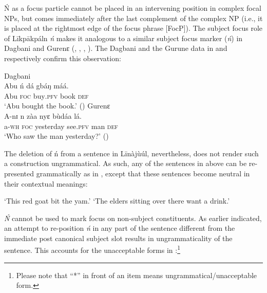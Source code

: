 \documentclass[output=paper,colorlinks,citecolor=brown]{langscibook}
\begin{document}
Ń as a focus particle cannot be placed in an intervening position in complex focal NPs, but comes immediately after the last complement of the complex NP (i.e., it is placed at the rightmost edge of the focus phrase [FocP]). The subject focus role of Līkpākpáln \textit{ń} makes it analogous to a similar subject focus marker (\textit{ń}) in Dagbani and Gurenɛ (\citealt[4]{Dakubu2003}, \citealt[169]{Issah2013Focus}, \citealt[5]{IssahSmith2018}, \citealt[169]{Akrofi-Ansah2014}). The Dagbani and the Gurune data in  and  respectively confirm this observation:

\ea%
    \label{ex:bisilki:10}
    \ea\label{ex:bisilki:10a}
    Dagbani\\
    \gll    Abu	ń	dá		gbáŋ	máá.\\
            Abu	\textsc{foc}	buy\textsc{.pfv}	book	\textsc{def}\\
    \glt    ‘Abu bought the book.’ \hfill (\citealt[5]{IssahSmith2018})
    \ex\label{ex:bisilki:10b}
    Gurenɛ\\
    \gll    A-nɪ	n	zàa		nyɛ		bùdáa	lá.\\
            a\textsc{-wh}	\textsc{foc}	yesterday	see\textsc{.pfv}	man	\textsc{def}\\
    \glt    ‘Who saw the man yesterday?’ \hfill (\citealt[4]{Dakubu2003})
    \z
\z

The deletion of ń from a sentence in Līnàjùúl, nevertheless, does not render such a construction ungrammatical. As such, any of the sentences in  above can be re-presented grammatically as in , except that these sentences become neutral in their contextual meanings:

\ea%
    \label{ex:bisilki:11}
    \jambox*{[neutral]}
    \glt    ‘This red goat bit the yam.’
    \jambox*{[neutral]}
    \glt    ‘The elders sitting over there want a drink.’
    \z
\z

\textit{Ń} cannot be used to mark focus on non-subject constituents. As earlier indicated, an attempt to re-position\textit{ ń} in any part of the sentence different from the immediate post canonical subject slot results in ungrammaticality of the sentence. This accounts for the unacceptable forms in :\footnote{Please note that ``*'' in front of an item means ungrammatical/unacceptable form.}
\end{document}

